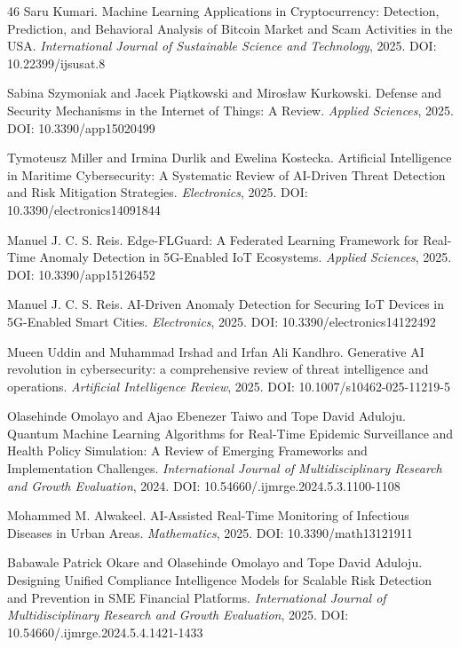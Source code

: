 \documentclass[3p,times,procedia]{elsarticle}
\begin{document}
\begin{thebibliography}{46}
Saru Kumari.
Machine Learning Applications in Cryptocurrency: Detection, Prediction, and Behavioral Analysis of Bitcoin Market and Scam Activities in the USA.
\textit{International Journal of Sustainable Science and Technology}, 2025.
DOI: 10.22399/ijsusat.8

Sabina Szymoniak and Jacek Piątkowski and Mirosław Kurkowski.
Defense and Security Mechanisms in the Internet of Things: A Review.
\textit{Applied Sciences}, 2025.
DOI: 10.3390/app15020499

Tymoteusz Miller and Irmina Durlik and Ewelina Kostecka.
Artificial Intelligence in Maritime Cybersecurity: A Systematic Review of AI-Driven Threat Detection and Risk Mitigation Strategies.
\textit{Electronics}, 2025.
DOI: 10.3390/electronics14091844

Manuel J. C. S. Reis.
Edge-FLGuard: A Federated Learning Framework for Real-Time Anomaly Detection in 5G-Enabled IoT Ecosystems.
\textit{Applied Sciences}, 2025.
DOI: 10.3390/app15126452

Manuel J. C. S. Reis.
AI-Driven Anomaly Detection for Securing IoT Devices in 5G-Enabled Smart Cities.
\textit{Electronics}, 2025.
DOI: 10.3390/electronics14122492

Mueen Uddin and Muhammad Irshad and Irfan Ali Kandhro.
Generative AI revolution in cybersecurity: a comprehensive review of threat intelligence and operations.
\textit{Artificial Intelligence Review}, 2025.
DOI: 10.1007/s10462-025-11219-5

Olasehinde Omolayo and Ajao Ebenezer Taiwo and Tope David Aduloju.
Quantum Machine Learning Algorithms for Real-Time Epidemic Surveillance and Health Policy Simulation: A Review of Emerging Frameworks and Implementation Challenges.
\textit{International Journal of Multidisciplinary Research and Growth Evaluation}, 2024.
DOI: 10.54660/.ijmrge.2024.5.3.1100-1108

Mohammed M. Alwakeel.
AI-Assisted Real-Time Monitoring of Infectious Diseases in Urban Areas.
\textit{Mathematics}, 2025.
DOI: 10.3390/math13121911

Babawale Patrick Okare and Olasehinde Omolayo and Tope David Aduloju.
Designing Unified Compliance Intelligence Models for Scalable Risk Detection and Prevention in SME Financial Platforms.
\textit{International Journal of Multidisciplinary Research and Growth Evaluation}, 2025.
DOI: 10.54660/.ijmrge.2024.5.4.1421-1433


\end{thebibliography}
\end{document}
